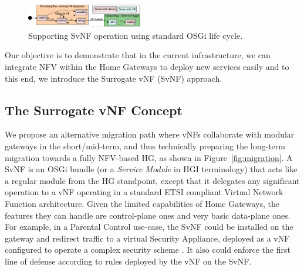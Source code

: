 

\begin{figure}
	
	\center

	\includegraphics[width=0.45\textwidth]{fig/osgi.pdf}
	\caption{ Supporting SvNF operation using standard OSGi life cycle.
    \label{fig:osgisvnf}
    }
\end{figure}
	   


Our objective is to demonstrate that in the current infrastructure, we can integrate NFV within the Home Gateways to deploy new services easily and to this end, we introduce the Surrogate vNF (SvNF) approach.

\subsection{The Surrogate vNF Concept}

We propose an alternative migration path where vNFs collaborate with modular gateways in the short/mid-term, and thus technically preparing the long-term migration towards a fully NFV-based HG, as shown in Figure~\ref{fig:migration}.
A SvNF is an OSGi bundle (or a \textit{Service Module} in HGI terminology) that acts like a regular module from the HG standpoint, except that it delegates any significant operation to a vNF operating in a standard ETSI compliant Virtual Network Function architecture. 
Given the limited capabilities of Home Gateways, the features they can handle are control-plane ones and very basic data-plane ones.
For example, in a Parental Control use-case, the SvNF could be installed on the gateway and redirect traffic to a virtual Security Appliance, deployed as a vNF configured to operate a complex security scheme \cite{basile_novel_2015}. It also could enforce the first line of defense according to rules deployed by the vNF on the SvNF.

